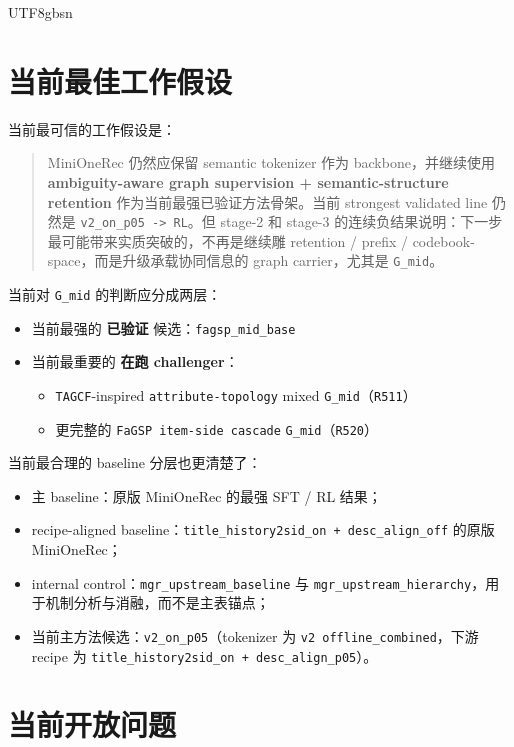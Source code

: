 \documentclass[11pt]{article}
\begin{document}
\begin{CJK*}{UTF8}{gbsn}
\section{当前最佳工作假设}

当前最可信的工作假设是：

\begin{quote}
MiniOneRec 仍然应保留 semantic tokenizer 作为 backbone，并继续使用 \textbf{ambiguity-aware graph supervision + semantic-structure retention} 作为当前最强已验证方法骨架。当前 strongest validated line 仍然是 \texttt{v2\_on\_p05 -> RL}。但 stage-2 和 stage-3 的连续负结果说明：下一步最可能带来实质突破的，不再是继续雕 retention / prefix / codebook-space，而是升级承载协同信息的 graph carrier，尤其是 \texttt{G\_mid}。
\end{quote}

当前对 \texttt{G\_mid} 的判断应分成两层：

\begin{itemize}
  \item 当前最强的 \textbf{已验证} 候选：\texttt{fagsp\_mid\_base}
  \item 当前最重要的 \textbf{在跑 challenger}：
  \begin{itemize}
    \item \texttt{TAGCF}-inspired \texttt{attribute-topology} mixed \texttt{G\_mid}（\texttt{R511}）
    \item 更完整的 \texttt{FaGSP item-side cascade} \texttt{G\_mid}（\texttt{R520}）
  \end{itemize}
\end{itemize}

当前最合理的 baseline 分层也更清楚了：

\begin{itemize}
  \item 主 baseline：原版 MiniOneRec 的最强 SFT / RL 结果；
  \item recipe-aligned baseline：\texttt{title\_history2sid\_on + desc\_align\_off} 的原版 MiniOneRec；
  \item internal control：\texttt{mgr\_upstream\_baseline} 与 \texttt{mgr\_upstream\_hierarchy}，用于机制分析与消融，而不是主表锚点；
  \item 当前主方法候选：\texttt{v2\_on\_p05}（tokenizer 为 \texttt{v2 offline\_combined}，下游 recipe 为 \texttt{title\_history2sid\_on + desc\_align\_p05}）。
\end{itemize}

\section{当前开放问题}


\end{CJK*}
\end{document}
